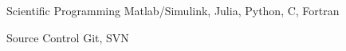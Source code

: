 


\begin{cvskills}



  \cvskill
    {Scientific Programming} %
    {Matlab/Simulink, Julia, Python, C, Fortran} %


  \cvskill
    {Source Control} %
    {Git, SVN} %






\end{cvskills}

